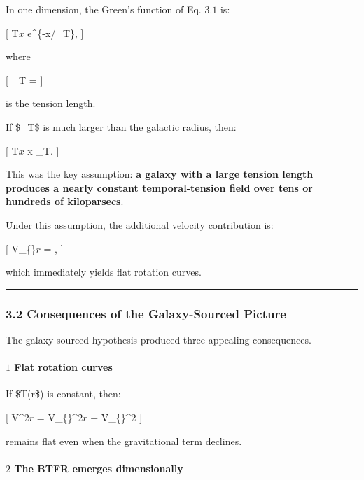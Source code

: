 In one dimension, the Green's function of Eq. \(3.1\) is:

{[} T\(x\) \propto e\^{}\{-\textbar x\textbar/\ell\_T\},  {]}

where

{[} \ell\_T =   {]}

is the tension length.

If \$\ell\_T\$ is much larger than the galactic radius, then:

{[} T\(x\) \approx {} \quad {} \textbar x\textbar{}
\ll \ell\_T.  {]}

This was the key assumption: \textbf{a galaxy with a large tension
length produces a nearly constant temporal-tension field over tens or
hundreds of kiloparsecs}.

Under this assumption, the additional velocity contribution is:

{[} V\_\{\}\(r\) =  \approx {},
 {]}

which immediately yields flat rotation curves.

\begin{center}\rule{0.5\linewidth}{0.5pt}\end{center}

\subsubsection{3.2 Consequences of the Galaxy-Sourced
Picture}\label{consequences-of-the-galaxy-sourced-picture}

The galaxy-sourced hypothesis produced three appealing consequences.

\paragraph{\texorpdfstring{\textbf{\(1\) Flat rotation
curves}}{1 Flat rotation curves}}\label{flat-rotation-curves}

If \$T(r\$) is constant, then:

{[} V\^{}2\(r\) = V\_\{\}\^{}2\(r\) + V\_\{\}\^{}2
 {]}

remains flat even when the gravitational term declines.

\paragraph{\texorpdfstring{\textbf{\(2\) The BTFR emerges
dimensionally}}{2 The BTFR emerges dimensionally}}\label{the-btfr-emerges-dimensionally}


